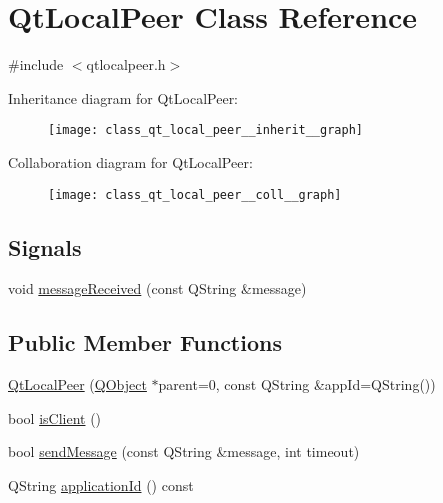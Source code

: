 \hypertarget{class_qt_local_peer}{\section{Qt\-Local\-Peer Class Reference}
\label{class_qt_local_peer}
}


{\ttfamily \#include $<$qtlocalpeer.\-h$>$}



Inheritance diagram for Qt\-Local\-Peer\-:\nopagebreak
\begin{figure}[H]
\begin{center}
\leavevmode
\texttt{[image: class\_qt\_local\_peer\_\_inherit\_\_graph]}
\end{center}
\end{figure}


Collaboration diagram for Qt\-Local\-Peer\-:\nopagebreak
\begin{figure}[H]
\begin{center}
\leavevmode
\texttt{[image: class\_qt\_local\_peer\_\_coll\_\_graph]}
\end{center}
\end{figure}
\subsection*{Signals}
\begin{DoxyCompactItemize}
\item 
void \hyperlink{class_qt_local_peer_a4436ad976edb6f177de1300b5aab9bfe}{message\-Received} (const Q\-String \&message)
\end{DoxyCompactItemize}
\subsection*{Public Member Functions}
\begin{DoxyCompactItemize}
\item 
\hyperlink{class_qt_local_peer_a7f6f94203a6ece5b14c8c800da1e40ab}{Qt\-Local\-Peer} (\hyperlink{class_q_object}{Q\-Object} $\ast$parent=0, const Q\-String \&app\-Id=Q\-String())
\item 
bool \hyperlink{class_qt_local_peer_a72f4ec6cda404661094778f98296d2a9}{is\-Client} ()
\item 
bool \hyperlink{class_qt_local_peer_ab239cb6dcea36512d43df6ca07881ea7}{send\-Message} (const Q\-String \&message, int timeout)
\item 
Q\-String \hyperlink{class_qt_local_peer_a2f7d615b1eebd738a4025894d8e213d4}{application\-Id} () const 
\end{DoxyCompactItemize}
